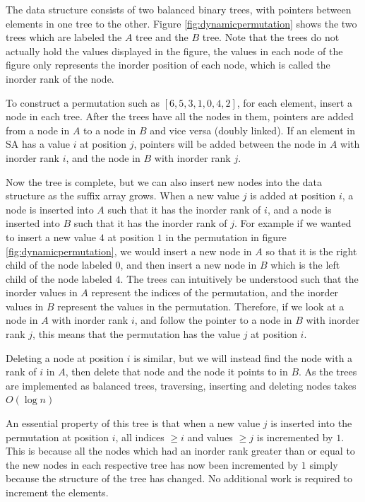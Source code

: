 The data structure consists of two balanced binary trees, with pointers between elements
in one tree to the other. Figure \ref{fig:dynamicpermutation} shows the two trees
which are labeled the $A$ tree and the $B$ tree. Note that the trees do not actually hold
the values displayed in the figure, the values in each node of the figure only represents
the inorder position of each node, which is called the inorder rank of the node.

To construct a permutation such as $[6,5,3,1,0,4,2]$, for each element, insert a node in
each tree. After the trees have all the nodes in them, pointers are added from a node in
$A$ to a node in $B$ and vice versa (doubly linked). If an element in SA has a value $i$
at position $j$, pointers will be added between the node in $A$ with inorder rank $i$, and
the node in $B$ with inorder rank $j$. 

Now the tree is complete, but we can also insert new nodes into the data structure as the
suffix array grows. When a new value $j$ is added at position $i$, a node is inserted into
$A$ such that it has the inorder rank of $i$, and a node is inserted into $B$ such that it
has the inorder rank of $j$. For example if we wanted to insert a new value $4$ at
position $1$ in the permutation in figure \ref{fig:dynamicpermutation}, we would insert a
new node in $A$ so that it is the right child of the node labeled $0$, and then insert a
new node in $B$ which is the left child of the node labeled $4$. The trees can intuitively
be understood such that the inorder values in $A$ represent the indices of the
permutation, and the inorder values in $B$ represent the values in the permutation.
Therefore, if we look at a node in $A$ with inorder rank $i$, and follow the pointer to a
node in $B$ with inorder rank $j$, this means that the permutation has the value $j$ at
position $i$. 

Deleting a node at position $i$ is similar, but we will instead find the node with a rank
of $i$ in $A$, then delete that node and the node it points to in $B$. As the trees are
implemented as balanced trees, traversing, inserting and deleting nodes takes $O(\log n)$

An essential property of this tree is that when a new value $j$ is inserted into the
permutation at position $i$, all indices $\geq i$ and values $\geq j$ is incremented by
$1$. This is because all the nodes which had an inorder rank greater than or equal to the
new nodes in each respective tree has now been incremented by $1$ simply because the
structure of the tree has changed. No additional work is required to increment the
elements. 

